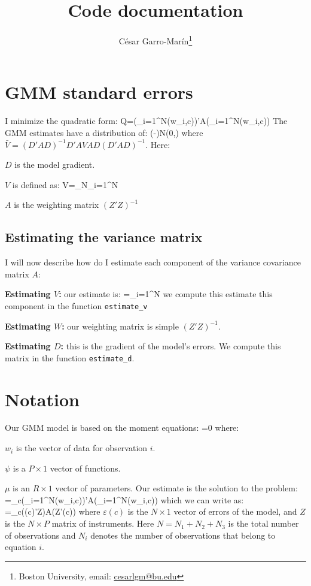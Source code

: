 \documentclass[a4paper, 12pt]{article}
\title{Code documentation}
\author{C\'esar Garro-Mar\'in\thanks{Boston University, email: \href{mailto:cesarlgm@bu.edu}{cesarlgm@bu.edu}}}
\begin{document}
\maketitle

\section{GMM standard errors}
I minimize the quadratic form:
\beqn
Q=\left(\sum_{i=1}^{N}\psi(w_i,c)\right)'A\left(\sum_{i=1}^{N}\psi(w_i,c)\right)
\eeqn 
The GMM estimates have a distribution of:
\beqns
{}(\hat\mu-\mu)\rightarrow N(0,)
\eeqns
where $\bar{V}=(D'AD)^{-1}D'AVAD(D'AD)^{-1}$. Here:
\bitem
	\item $D$ is the model gradient.
	\item $V$ is defined as:
	\beqns
		V=\lim_{N\rightarrow\infty}\sum_{i=1}^N
	\eeqns
	\item $A$ is the weighting matrix $(Z'Z)^{-1}$
\eitem

\subsection{Estimating the variance matrix}
I will now describe how do I estimate each component of the variance covariance matrix $A$:
\bitem 
	\item \textbf{Estimating $V$:} our estimate is:
	\beqns
	=\sum_{i=1}^N
	\eeqns
	we compute this estimate this component in the function {\tt estimate\_v}
	\item \textbf{Estimating $W$:} our weighting matrix is simple $(Z'Z)^{-1}$.
	\item \textbf{Estimating $D$:} this is the gradient of the model's errors. We compute this matrix in the function {\tt estimate\_d}.
\eitem


\appendix
\section{Notation}
Our GMM model is based on the moment equations:
\beqns
	=0	
\eeqns
where:
\bitem
\item $w_i$ is the vector of data for observation $i$.
\item $\psi$ is a $P\times 1$ vector of functions.
\item $\mu$ is an $R\times 1$ vector of parameters. 
\eitem 
Our estimate is the solution to the problem:
\beqns
	\hat{\mu}=\arg\min_c\left(\sum_{i=1}^{N}\psi(w_i,c)\right)'A\left(\sum_{i=1}^{N}\psi(w_i,c)\right)
\eeqns
which we can write as:
\beqns
	\hat{\mu}=\arg\min_c\left(\varepsilon(c)'Z\right)A\left(Z'\varepsilon(c)\right)
\eeqns
where $\varepsilon(c)$ is the $N\times 1$ vector of errors of the model, and $Z$ is the $N\times P$ matrix of instruments. Here $N=N_1+N_2+N_3$ is the total number of observations and $N_i$ denotes the number of observations that belong to equation $i$. 

\end{document}
